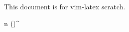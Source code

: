 \documentclass{article}
\begin{document}
This document is for vim-latex scratch.


n  ()^{\circ}
\end{document}
